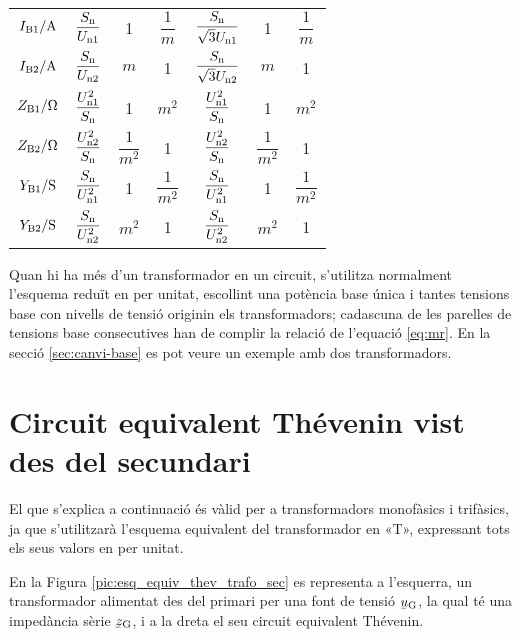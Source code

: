 \begin{ThreePartTable}
\begin{longtable}{ccccccc}
$I\ped{B1}/\si{A}$ & $\dfrac{S\ped{n}}{U\ped{n1}}$ & 1 & $\dfrac{1}{m}$ & $\dfrac{S\ped{n}}{\sqrt{3}U\ped{n1}}$ & 1  & $\dfrac{1}{m}$\\[0.4cm]
$I\ped{B2}/\si{A}$ & $\dfrac{S\ped{n}}{U\ped{n2}}$  & $m$ & 1 & $\dfrac{S\ped{n}}{\sqrt{3}U\ped{n2}}$   & $m$ & 1\\[0.4cm]
$Z\ped{B1}/\si{\ohm}$ & $\dfrac{U\ped{n1}^2}{S\ped{n}}$ & 1 & $m^2$ & $\dfrac{U\ped{n1}^2}{S\ped{n}}$ & 1 & $m^2$\\[0.4cm]
$Z\ped{B2}/\si{\ohm}$ & $\dfrac{U\ped{n2}^2}{S\ped{n}}$  & $\dfrac{1}{m^2}$ & 1& $\dfrac{U\ped{n2}^2}{S\ped{n}}$  & $\dfrac{1}{m^2}$ & 1\\[0.4cm]
$Y\ped{B1}/\si{S}$ & $\dfrac{S\ped{n}}{U\ped{n1}^2}$ & 1 & $\dfrac{1}{m^2}$ & $\dfrac{S\ped{n}}{U\ped{n1}^2}$ & 1 & $\dfrac{1}{m^2}$ \\[0.4cm]
$Y\ped{B2}/\si{S}$ & $\dfrac{S\ped{n}}{U\ped{n2}^2}$  & $m^2$ & 1 & $\dfrac{S\ped{n}}{U\ped{n2}^2}$ &$m^2$ &  1\\[0.4cm]
\bottomrule[1pt]
\end{longtable}
\end{ThreePartTable}


Quan hi ha més d'un transformador en un circuit, s'utilitza normalment l'esquema reduït en per unitat, escollint una potència base única i tantes tensions base con nivells de tensió  originin els transformadors; cadascuna de les parelles de tensions base consecutives han de complir la relació de l'equació \eqref{eq:mr}. En la secció \vref{sec:canvi-base} es pot veure un exemple amb dos transformadors.

\section{Circuit equivalent Thévenin vist des del secundari}\label{sec:trafo-thevenin}

El que s'explica a continuació és vàlid per a transformadors
monofàsics i trifàsics, ja que s'utilitzarà l'esquema equivalent del
transformador en «T», expressant tots els seus valors en per unitat.

En la Figura \vref{pic:esq_equiv_thev_trafo_sec}  es representa a
l'esquerra, un transformador alimentat des del primari per una font
de tensió $\cmplx{u}\ped{G}$, la qual té una impedància sèrie
$\cmplx{z}\ped{G}$, i a  la dreta el seu circuit equivalent
Thévenin.

\begin{center}
    
    \label{pic:esq_equiv_thev_trafo_sec}
\end{center}

